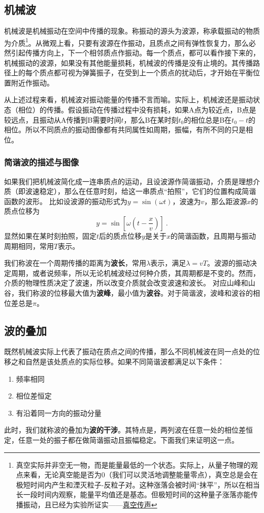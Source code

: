 
\subsection{机械波}
机械波是机械振动在空间中传播的现象。称振动的源头为波源，称承载振动的物质为介质\footnote{真空实际并非空无一物，而是能量最低的一个状态。实际上，从量子物理的观点来看，无论真空能是否为0（我们可以灵活地调整能量零点），真空总是会在极短时间内产生和湮灭粒子-反粒子对。这种涨落会被时间“抹平”，所以在相当长一段时间内观察，能量平均值还是基态。但极短时间的这种量子涨落亦能传播振动，且已经为实验所证实——\href{https://www.rmzxw.com.cn/c/2023-08-25/3399291.shtml}{真空传声}}。从微观上看，只要有波源在作振动，且质点之间有弹性恢复力，那么必然引起传播方向上，下一个相邻质点作振动。每一个质点，都可以看作接下来的，机械振动的波源，如果没有其他能量损耗，机械波的传播是没有止境的。其传播路径上的每个质点都可视为弹簧振子，在受到上一个质点的扰动后，才开始在平衡位置附近作振动。

从上述过程来看，机械波对振动能量的传播不言而喻。实际上，机械波还是振动状态（相位）的传播。假设振动在传播过程中没有损耗，如果A点为较近点，B点是较远点，且振动从A传播到B需要时间$t$，那么B在某时刻$t_0$的相位总是B在$t_0-t$的相位。所以不同质点的振动图像都有共同属性如周期，振幅，有所不同的只是相位。
\subsubsection{简谐波的描述与图像}
如果我们把机械波简化成一连串质点的运动，且设波源作简谐振动，介质是理想介质（即波速稳定），那么在任意时刻，给这一串质点“拍照”，它们的位置构成简谐函数的波形。
比如设波源的振动形式为$y=\sin(\omega t)$，波速为$v$，那么距波源$x$的质点位移为
\begin{equation}
y=\sin [\omega (t-\frac{x}{v})]~.
\end{equation}
显然如果在某时刻拍照，固定$t$后的质点位移$y$是关于$x$的简谐函数，且周期与振动周期相同，常用$T$表示。%

我们称波在一个周期传播的距离为\textbf{波长}，常用$\lambda $表示，满足$\lambda=vT$。波源的振动决定周期，或者说频率，所以无论机械波经过何种介质，其周期都是不变的。然而，介质的物理性质决定了波速，所以改变介质就会改变波速和波长。
对应山峰和山谷，我们称波的位移最大值为\textbf{波峰}，最小值为\textbf{波谷}。对于简谐波，波峰和波谷的相位差总是$\pi$。

\subsection{波的叠加}
既然机械波实际上代表了振动在质点之间的传播，那么不同机械波在同一点处的位移之和自然是该处质点的实际位移。如果不同简谐波都满足以下条件：
\begin{enumerate}
\item 频率相同
\item 相位差恒定
\item 有沿着同一方向的振动分量
\end{enumerate}
此时，我们就称波的叠加为\textbf{波的干涉}。其特点是，两列波在任意一处的相位差恒定，任意一处的振子都在做简谐振动且振幅稳定。下面我们来证明这一点。

